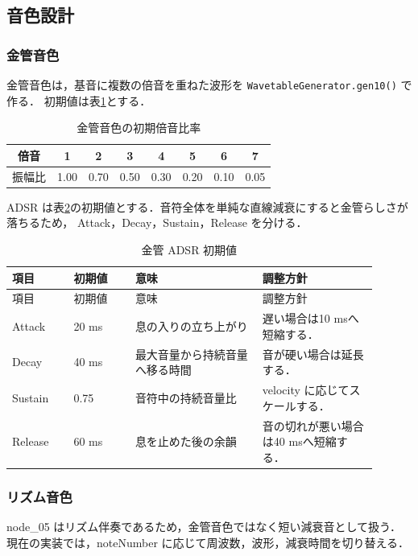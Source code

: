 \documentclass[lualatex,book,paper=a4paper,jafontsize=11.5pt,jafontscale=1.05]{jlreq}
\begin{document}
\subsection{音色設計}
\subsubsection{金管音色}
金管音色は，基音に複数の倍音を重ねた波形を \texttt{WavetableGenerator.gen10()} で作る．
初期値は表\ref{tab:harmonics}とする．

\begin{table}[htbp]
\centering
\caption{金管音色の初期倍音比率}\label{tab:harmonics}
\begin{tabular}{cccccccc}
\toprule
倍音 & 1 & 2 & 3 & 4 & 5 & 6 & 7 \\
\midrule
振幅比 & 1.00 & 0.70 & 0.50 & 0.30 & 0.20 & 0.10 & 0.05 \\
\bottomrule
\end{tabular}
\end{table}

ADSR は表\ref{tab:adsr}の初期値とする．音符全体を単純な直線減衰にすると金管らしさが落ちるため，
Attack，Decay，Sustain，Release を分ける．

\begin{longtable}{p{0.15\linewidth}p{0.15\linewidth}p{0.31\linewidth}p{0.29\linewidth}}
\caption{金管 ADSR 初期値}\label{tab:adsr}\\
\toprule
項目 & 初期値 & 意味 & 調整方針 \\
\midrule
\endfirsthead
\toprule
項目 & 初期値 & 意味 & 調整方針 \\
\midrule
\endhead
Attack & 20 ms & 息の入りの立ち上がり & 遅い場合は10 msへ短縮する． \\
Decay & 40 ms & 最大音量から持続音量へ移る時間 & 音が硬い場合は延長する． \\
Sustain & 0.75 & 音符中の持続音量比 & velocity に応じてスケールする． \\
Release & 60 ms & 息を止めた後の余韻 & 音の切れが悪い場合は40 msへ短縮する． \\
\bottomrule
\end{longtable}

\subsubsection{リズム音色}
node\_05 はリズム伴奏であるため，金管音色ではなく短い減衰音として扱う．
現在の実装では，noteNumber に応じて周波数，波形，減衰時間を切り替える．
\end{document}
